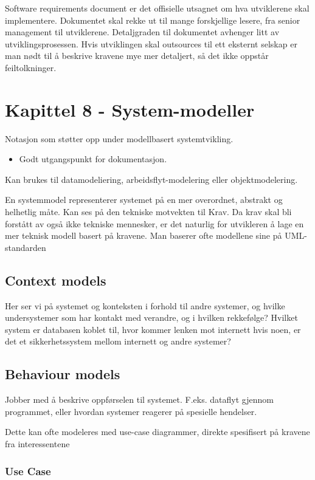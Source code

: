 \documentclass[11pt]{article}
\begin{document}
   Software requirements document er det offisielle utsagnet om hva utviklerene skal implementere. 
   Dokumentet skal rekke ut til mange forskjellige lesere, fra senior management til utviklerene.
   Detaljgraden til dokumentet avhenger litt av utviklingsprosessen. Hvis utviklingen skal outsources 
   til ett eksternt selskap er man nødt til å beskrive kravene mye mer detaljert, så det ikke oppstår feiltolkninger.
\section{Kapittel 8 - System-modeller}
\label{sec-7}


  Notasjon som støtter opp under modellbasert systemtvikling.
\begin{itemize}
\item Godt utgangspunkt for dokumentasjon.
\end{itemize}
  Kan brukes til datamodeliering, arbeidsflyt-modelering eller objektmodelering.

  En systemmodel representerer systemet på en mer overordnet, abstrakt og helhetlig måte. 
  Kan ses på den tekniske motvekten til Krav. Da krav skal bli forstått av også
  ikke tekniske mennesker, er det naturlig for utvikleren å lage en mer teknisk
  modell basert på kravene. Man baserer ofte modellene sine på UML-standarden
  
\subsection{Context models}
\label{sec-7.1}

   
   Her ser vi på systemet og konteksten i forhold til andre systemer, og hvilke 
   undersystemer som har kontakt med verandre, og i hvilken rekkefølge? Hvilket system
   er databasen koblet til, hvor kommer lenken mot internett hvis noen, er det et 
   sikkerhetssystem mellom internett og andre systemer?
\subsection{Behaviour models}
\label{sec-7.2}

   Jobber med å beskrive oppførselen til systemet. F.eks. dataflyt gjennom programmet, 
   eller hvordan systemer reagerer på spesielle hendelser.

   Dette kan ofte modeleres med use-case diagrammer, direkte spesifisert på kravene
   fra interessentene
\subsubsection{Use Case}
\label{sec-7.2.1}
\end{document}

